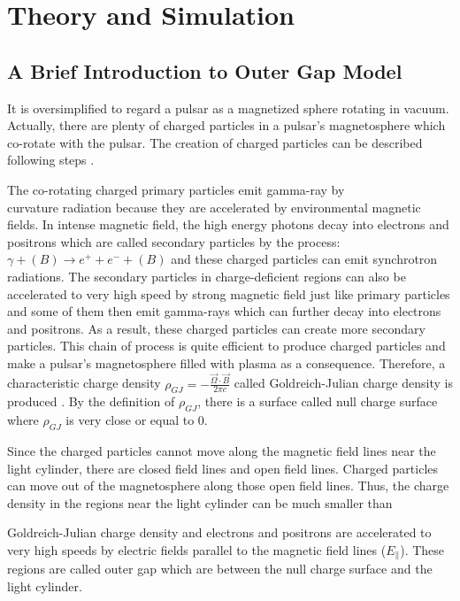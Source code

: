 \documentclass[12pt]{report}
\newcommand{\gj}[0]{
  Goldreich-Julian charge density
}
\begin{document}
    \chapter{Theory and Simulation}
      \section{A Brief Introduction to Outer Gap Model}
        It is oversimplified to regard a pulsar as a magnetized sphere rotating in vacuum. 
        Actually, there are plenty of charged particles in a pulsar's magnetosphere 
        which co-rotate with the pulsar. The creation of charged particles can 
        be described following steps \cite{Sturrock:1971zc}.

        The co-rotating charged primary particles emit gamma-ray by \\curvature 
        radiation because they are accelerated by environmental magnetic fields.  
        In intense magnetic field, the high energy photons decay into electrons and 
        positrons which are called secondary particles by the process: 
        $\gamma + (B) \rightarrow e^++e^-+(B)$ and these charged particles can emit 
        synchrotron radiations. The secondary particles in charge-deficient regions can also 
        be accelerated to very high speed by strong magnetic field just like primary particles 
        and some of them then emit gamma-rays which can further decay into electrons and 
        positrons. As a result, these charged particles can create more secondary particles.
        This chain of process is quite efficient to produce charged particles and 
        make a pulsar's magnetosphere filled with plasma as a consequence. Therefore, a 
        characteristic charge density $\rho_{GJ}=-\frac{\vec{\Omega}\cdot \vec{B}}{2\pi c}$ 
        called Goldreich-Julian charge density is produced \cite{1969ApJ}. By the definition 
        of $\rho_{GJ}$, there is a surface called null charge surface where $\rho_{GJ}$ is 
        very close or equal to $0$. 

        Since the charged particles cannot move along the magnetic field lines near 
        the light cylinder, there are closed field lines and open field lines. Charged 
        particles can move out of the magnetosphere along those open field lines. Thus, the 
        charge density in the regions near the light cylinder can be much smaller than 
        \gj{} and electrons and positrons are accelerated to very high speeds by electric 
        fields parallel to the magnetic field lines ($E_{\parallel}$). These regions are called 
        outer gap which are between the null charge surface and the light cylinder.
        \cite{1986ApJ...300..500C} 
        
\end{document}
